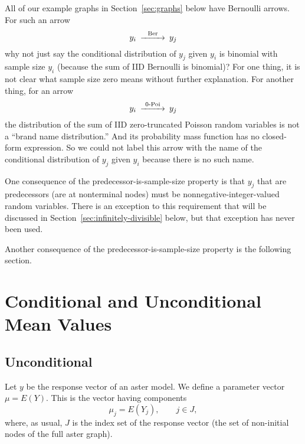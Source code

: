 All of our example graphs in Section~\ref{sec:graphs} below
have Bernoulli arrows.  For such an arrow
$$
\begin{CD}
   y_i @>\text{Ber}>> y_j
\end{CD}
$$
why not just say the conditional distribution of $y_j$ given $y_i$ is binomial
with sample size $y_i$ (because the sum of IID Bernoulli is binomial)?
For one thing,
it is not clear what sample size zero means without further explanation.
For another thing, for an arrow
$$
\begin{CD}
   y_i @>\text{0-Poi}>> y_j
\end{CD}
$$
the distribution of the sum of IID zero-truncated Poisson random variables
is not a ``brand name distribution.''  And its
probability mass function has no closed-form expression.
So we could not label this arrow with the name of the conditional distribution
of $y_j$ given $y_i$ because there is no such name.

One consequence of the predecessor-is-sample-size property is that $y_j$
that are predecessors (are at nonterminal nodes) must be
nonnegative-integer-valued random variables.
There is an exception to this requirement that will be discussed in
Section~\ref{sec:infinitely-divisible} below, but that exception has
never been used.

Another consequence of the predecessor-is-sample-size property is
the following section.

\section{Conditional and Unconditional Mean Values}
\label{sec:conditional-and-unconditional-mean-values}

\subsection{Unconditional}

Let $y$ be the response vector of an aster model.  We define a parameter
vector $\mu = E(Y)$.  This is the vector having components
\begin{equation} \label{eq:unconditional-mean-values}
   \mu_j = E(Y_j), \qquad j \in J,
\end{equation}
where, as usual, $J$ is the index set of the response vector (the set
of non-initial nodes of the full aster graph).

